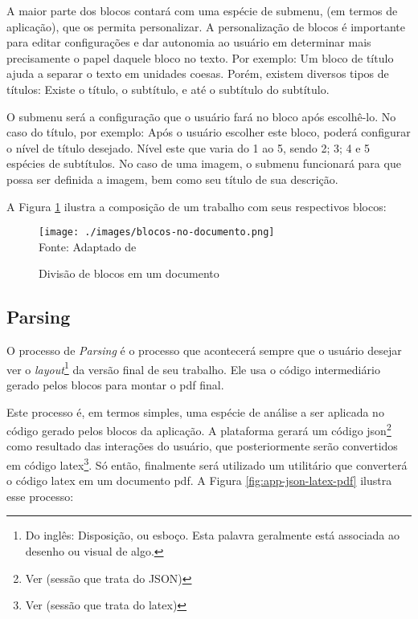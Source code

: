 A maior parte dos blocos contará com uma espécie de submenu, (em termos de aplicação),
que os permita personalizar. A personalização de blocos é importante para editar
configurações e dar autonomia ao usuário em determinar mais precisamente o papel
daquele bloco no texto. Por exemplo: Um bloco de título ajuda a separar o texto
em unidades coesas. Porém, existem diversos tipos de títulos: Existe o título, o
subtítulo, e até o subtítulo do subtítulo.

O submenu será a configuração que o usuário fará no bloco após escolhê-lo. No
caso do título, por exemplo: Após o usuário escolher este bloco, poderá configurar
o nível de título desejado. Nível este que varia do 1 ao 5, sendo 2; 3; 4 e 5
espécies de subtítulos. No caso de uma imagem, o submenu funcionará para que possa
ser definida a imagem, bem como seu título de sua descrição.

A
Figura \ref{fig:blocos-no-documento}
ilustra a composição de um trabalho com seus respectivos blocos:

\begin{figure}[H]
    \centering
    \caption{Divisão de blocos em um documento}
    \texttt{[image: ./images/blocos-no-documento.png]}
    \label{fig:blocos-no-documento} \\
    \textnormal{\fontsize{10pt}{12pt}Fonte: Adaptado de \cite{pucgo}}
\end{figure}

\subsection{Parsing}

O processo de \textit{Parsing} é o processo que acontecerá sempre que o usuário desejar
ver o
\textit{layout}\footnote{Do inglês: Disposição, ou esboço. Esta palavra geralmente está associada ao desenho ou visual de algo.
}
da versão final de seu trabalho. Ele usa o código intermediário gerado pelos blocos para montar o
\acrshort{pdf}
final.

Este processo é, em termos simples, uma espécie de análise a ser aplicada no código gerado pelos blocos
da aplicação. A plataforma gerará um código
\acrshort{json}\footnote{Ver (sessão que trata do JSON)
}
como resultado das interações do usuário, que posteriormente
serão convertidos em código
\acrshort{latex}\footnote{Ver (sessão que trata do \acrshort{latex})
}.
Só então, finalmente será utilizado um utilitário que converterá o código \acrshort{latex}
em um documento
\acrshort{pdf}. A
Figura \ref{fig:app-json-latex-pdf} ilustra esse processo:

